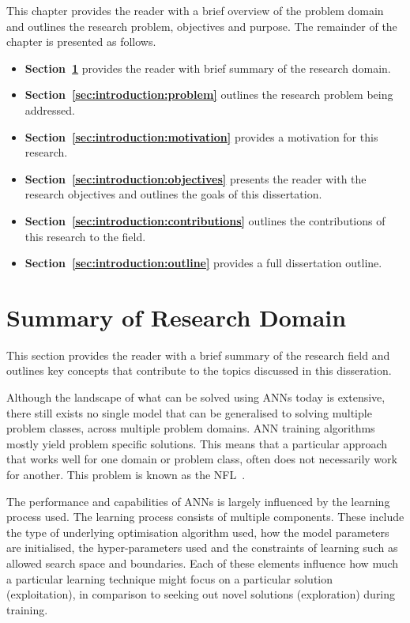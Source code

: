 This chapter provides the reader with a brief overview of the problem domain and outlines the research problem, objectives and purpose. The remainder of the chapter is presented as follows.

\begin{itemize}
      \item \textbf{Section~\ref{sec:introduction:summary_research_domain}} provides the reader with brief summary of the research domain.

      \item \textbf{Section~\ref{sec:introduction:problem}} outlines the research problem being addressed.

      \item \textbf{Section~\ref{sec:introduction:motivation}} provides a motivation for this research.

      \item \textbf{Section~\ref{sec:introduction:objectives}} presents the reader with the research objectives and outlines the goals of this dissertation.

      \item \textbf{Section~\ref{sec:introduction:contributions}} outlines the contributions of this research to the field.

      \item \textbf{Section~\ref{sec:introduction:outline}} provides a full dissertation outline.
\end{itemize}


\section{Summary of Research Domain}\label{sec:introduction:summary_research_domain}

This section provides the reader with a brief summary of the research field and outlines key concepts that contribute to the topics discussed in this disseration.

Although the landscape of what can be solved using \acp{ANN} today is extensive, there still exists no single model that can be generalised to solving multiple problem classes, across multiple problem domains. \acs{ANN} training algorithms mostly yield problem specific solutions. This means that a particular approach that works well for one domain or problem class, often does not necessarily work for another. This problem is known as the \acf{NFL}~\cite{ref:wolpert:1997}.

The performance and capabilities of \acp{ANN} is largely influenced by the learning process used. The learning process consists of multiple components. These include the type of underlying optimisation algorithm used, how the model parameters are initialised, the hyper-parameters used and the constraints of learning such as allowed search space and boundaries. Each of these elements influence how much a particular learning technique might focus on a particular solution (exploitation), in comparison to seeking out novel solutions (exploration) during training.

